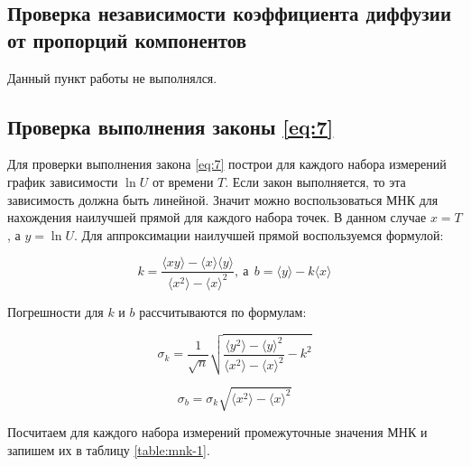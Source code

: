 \documentclass[a4paper,12pt]{article}
\begin{document}
\subsection{Проверка независимости коэффициента диффузии от пропорций компонентов}
\label{p:7}

Данный пункт работы не выполнялся.

\subsection{Проверка выполнения законы \eqref{eq:7}}

Для проверки выполнения закона \eqref{eq:7} построи для каждого набора измерений график зависимости $\ln{U}$ от времени $T$. Если закон выполняется, то эта зависимость должна быть линейной. Значит можно воспользоваться МНК для нахождения наилучшей прямой для каждого набора точек. В данном случае $x = T$, а $y = \ln{U}$. Для аппроксимации наилучшей прямой воспользуемся формулой:

\begin{equation}\label{eq:mnk}
    k = \frac{\langle xy\rangle - \langle x \rangle \langle y \rangle}{\langle x^2 \rangle - \langle x \rangle^2},
    \ \text{а} \ \  b = \langle y \rangle - k\langle x \rangle
\end{equation}

Погрешности для $k$ и $b$ рассчитываются по формулам:

\begin{equation}
    \sigma_k = \frac{1}{\sqrt{n}} \sqrt{\frac{\langle y^2 \rangle - \langle y \rangle^2}{\langle x^2 \rangle - \langle x \rangle^2} - k^2}
\end{equation}

\begin{equation}
    \sigma_b = \sigma_k\sqrt{\langle x^2 \rangle - \langle x \rangle^2}
\end{equation}

Посчитаем для каждого набора измерений промежуточные значения МНК и запишем их в таблицу \ref{table:mnk-1}.

\newpage
\end{document}
